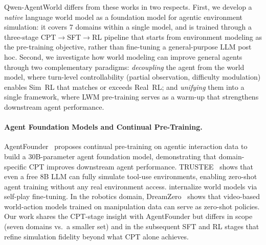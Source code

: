 \documentclass{llmxive}
\providecommand{\method}{Qwen-AgentWorld\xspace}
\begin{document}
\method differs from these works in two respects.
First, we develop a \emph{native} language world model as a foundation model for agentic environment simulation: it covers 7 domains within a single model, and is trained through a three-stage CPT$\to$SFT$\to$RL pipeline that starts from environment modeling as the pre-training objective, rather than fine-tuning a general-purpose LLM post hoc.
Second, we investigate how world modeling can improve general agents through two complementary paradigms: \emph{decoupling} the agent from the world model, where turn-level controllability (partial observation, difficulty modulation) enables Sim~RL that matches or exceeds Real~RL; and \emph{unifying} them into a single framework, where LWM pre-training serves as a warm-up that strengthens downstream agent performance.

\paragraph{Agent Foundation Models and Continual Pre-Training.}
AgentFounder~\citep{su2025scaling} proposes continual pre-training on agentic interaction data to build a 30B-parameter agent foundation model, demonstrating that domain-specific CPT improves downstream agent performance.
TRUSTEE~\citep{tang2026democratizingtoollearningenvironments} shows that even a free 8B LLM can fully simulate tool-use environments, enabling zero-shot agent training without any real environment access.
\citet{chen2025internalizing} internalize world models via self-play fine-tuning. In the robotics domain, DreamZero~\citep{ye2026world} shows that video-based world-action models trained on manipulation data can serve as zero-shot policies.
Our work shares the CPT-stage insight with AgentFounder but differs in scope (seven domains vs.\ a smaller set) and in the subsequent SFT and RL stages that refine simulation fidelity beyond what CPT alone achieves.
\end{document}
